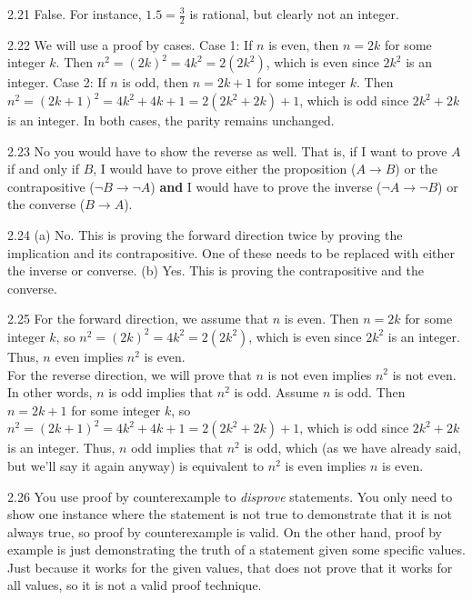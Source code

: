 \begin{RequAnswer}{2.21}
False. For instance, $1.5=\frac{3}{2}$ is rational, but clearly not an integer.
\end{RequAnswer}
\begin{RequAnswer}{2.22}
We will use a proof by cases.
Case 1: If $n$ is even, then $n=2k$ for some integer $k$.
Then $n^2=(2k)^2=4k^2=2(2k^2)$, which is even since
$2k^2$ is an integer.
Case 2: If $n$ is odd, then $n=2k+1$ for some integer $k$.
Then $n^2=(2k+1)^2=4k^2+4k+1=2(2k^2+2k)+1$, which is odd since $2k^2+2k$ is an integer.
In both cases, the parity remains unchanged.
\end{RequAnswer}
\begin{RequAnswer}{2.23}
No you would have to show the reverse as well.
That is, if I want to prove $A$ if and only if $B$,
I would have to prove either the proposition ($A\rightarrow B$) or the contrapositive ($\neg B \rightarrow \neg A$)
{\bf and} I would have to prove the inverse ($\neg A\rightarrow \neg B$) or the converse ($B\rightarrow A$).
\end{RequAnswer}
\begin{RequAnswer}{2.24}
(a) No. This is proving the forward direction twice by proving the implication and its contrapositive.
One of these needs to be replaced with either the inverse or converse.
(b) Yes. This is proving the contrapositive and the converse.
\end{RequAnswer}
\begin{RequAnswer}{2.25}
For the forward direction, we assume that $n$ is even.
Then $n=2k$ for some integer $k$,
so $n^2=(2k)^2=4k^2=2(2k^2)$, which is even since
$2k^2$ is an integer. Thus, $n$ even implies $n^2$ is even.\\
For the reverse direction, we will prove that
$n$ is not even implies $n^2$ is not even. In other words,
$n$ is odd implies that $n^2$ is odd.
Assume $n$ is odd. Then $n=2k+1$ for some integer $k$,
so $n^2=(2k+1)^2=4k^2+4k+1=2(2k^2+2k)+1$, which is odd since $2k^2+2k$ is an integer.
Thus, $n$ odd implies that $n^2$ is odd, which (as we have already
said, but we'll say it again anyway) is equivalent to
$n^2$ is even implies $n$ is even.
\end{RequAnswer}
\begin{RequAnswer}{2.26}
You use proof by counterexample to {\em disprove} statements. You only need to show
one instance where the statement is not true to demonstrate that it is not always true, so proof by counterexample
is valid. On the other hand, proof by example is just demonstrating the truth of a statement given some specific values.
Just because it works for the given values, that does not prove that it works for all values, so it is not a valid proof technique.
\end{RequAnswer}
